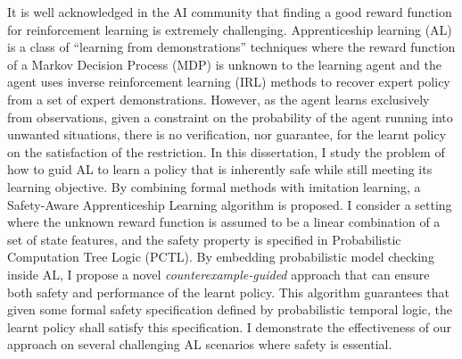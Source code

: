 It is well acknowledged in the AI community that finding a good reward function for reinforcement learning is extremely challenging. Apprenticeship learning (AL) is a class of ``learning from demonstrations'' techniques where the reward function of a Markov Decision Process (MDP) is unknown to the learning agent and the agent uses inverse reinforcement learning (IRL) methods to recover expert policy from a set of expert demonstrations. However, as the agent learns exclusively from observations, given a constraint on the probability of the agent running into unwanted situations, there is no verification, nor guarantee, for the learnt policy on the satisfaction of the restriction. In this dissertation, I study the problem of how to guid AL to learn a policy that is inherently safe while still meeting its learning objective. By combining formal methods with imitation learning, a Safety-Aware Apprenticeship Learning algorithm is proposed. I consider a setting where the unknown reward function is assumed to be a linear combination of a set of state features, and the safety property is specified in Probabilistic Computation Tree Logic (PCTL). By embedding probabilistic model checking inside AL, I propose a novel {\it counterexample-guided} approach that can ensure both safety and performance of the learnt policy. This algorithm guarantees that given some formal safety specification defined by probabilistic temporal logic, the learnt policy shall satisfy this specification. I demonstrate the effectiveness of our approach on several challenging AL scenarios where safety is essential.
